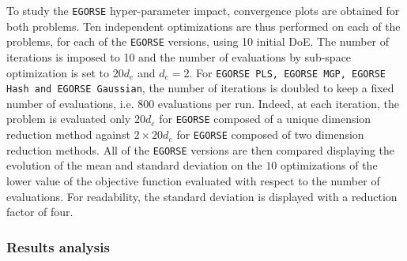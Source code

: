 To study the \texttt{EGORSE} hyper-parameter impact, convergence plots are obtained for both problems.
Ten independent optimizations are thus performed on each of the problems, for each of the \texttt{EGORSE} versions, using 10 initial DoE.
The number of iterations is imposed to 10 and the number of evaluations by sub-space optimization is set to $20d_e$ and $d_e=2$. 
For  \texttt{EGORSE PLS, \texttt{EGORSE} MGP, \texttt{EGORSE} Hash and \texttt{EGORSE} Gaussian}, the number of iterations is doubled to keep a fixed number of evaluations, i.e. 800 evaluations per run.
Indeed, at each iteration, the problem is evaluated only $20d_e$ for \texttt{EGORSE} composed of a unique dimension reduction method against $2\times20d_e$ for \texttt{EGORSE} composed of two dimension reduction methods.  
All of the \texttt{EGORSE} versions are then compared displaying the evolution of the mean and standard deviation on the $10$ optimizations of the lower value of the objective function evaluated with respect to the number of evaluations. 
For readability, the standard deviation is displayed with a reduction factor of four. 

\subsubsection{Results analysis}
\label{sssec:impact}

